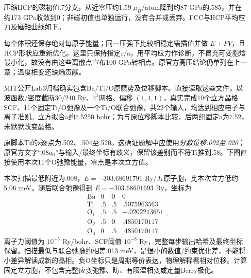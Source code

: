 压缩HCP的磁初值.7分支，从近零压约1.59 $\mu_B$/atom降到约87 GPa的.585，并在约173 GPa收敛到0；非磁初值也单独运行，没有合并或丢弃。FCC与HCP平均应力及磁矩曲线如下。
\begin{center}\end{center}
每个体积还保存绝对每原子能量；同一压强下比较相稳定需插值并做 $E+PV$，且HCP形状应重新优化。这里只保持指定c/a，用平均应力作诊断，不冒充可变胞焓最小化，故没有由这些离散点宣布100 GPa转相点。原官方高压结论仍单列在上一章；温度相变还缺熵贡献。

MIT公开Lab3归档确实包含Ba/Ti/O原赝势及位移脚本。直接读取这些文件，以波函数/密度截断30/240 Ry、$4^3$网格、偏移 $(1,1,1)$，真实完成10个立方晶格SCF、11个固定Ti/O弛豫及一个Ti/O联合弛豫，共22个输入，均达到相应电子与离子准则。立方拟合a约7.5250 bohr；为与原位移脚本比较，后两组固定a为7.52，未默默改变晶格。

原脚本Ti的z逐点为.502、.504至.520。这确证题解中应使用\emph{分数位移.002至.020}；原官方文字“.08$a_0$”与输入/最终坐标有歧义，保留该差别而不将Ti推到.58。下图直接使用本次11个O弛豫能量，零点是本次立方值。
\begin{center}\end{center}
本次扫描最低附近为.008，$E=-303.68691791$ Ry/五原子胞，比本次立方低约5.06 meV。随后联合弛豫得到 $E=-303.68691693$ Ry，坐标为
\[
\begin{array}{c|rrr}
\mathrm{Ba}&0&0&0\\\mathrm{Ti}&.5&.5&.5075963563\\
\mathrm O_1&.5&.5&-.0202213651\\
\mathrm O_2&.5&0&.4850170117\\
\mathrm O_3&0&.5&.4850170117
\end{array}.
\]
离子力阈值为 $10^{-5}$ Ry/bohr、SCF阈值 $10^{-8}$ Ry，完整每步输出哈希及最终坐标保留。扫描最低与联合弛豫约相差.013 meV，是很小的数值/约束优化差，不能将小差异解读成新的晶相。负O坐标只是周期等价表达，物理解释看相对位移。计算固定立方胞，不包含完整应变弛豫、畴、有限温相变或定量Berry极化。

